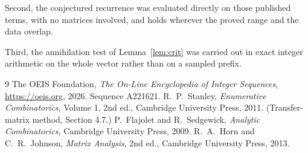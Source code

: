 \documentclass[11pt,a4paper]{article}
\theoremstyle{plain}
\theoremstyle{definition}
\begin{document}
Second, the conjectured recurrence was evaluated directly on those published terms, with no
matrices involved, and holds wherever the proved range and the data overlap.

Third, the annihilation test of Lemma~\ref{lem:crit} was carried out in exact integer
arithmetic on the whole vector rather than on a sampled prefix.

\begin{thebibliography}{9}
 The OEIS Foundation, \emph{The On-Line Encyclopedia of Integer
Sequences}, \url{https://oeis.org}, 2026. Sequence A221621.
 R.~P.~Stanley, \emph{Enumerative Combinatorics}, Volume 1, 2nd ed.,
Cambridge University Press, 2011. (Transfer-matrix method, Section 4.7.)
 P.~Flajolet and R.~Sedgewick, \emph{Analytic Combinatorics}, Cambridge
University Press, 2009.
 R.~A.~Horn and C.~R.~Johnson, \emph{Matrix Analysis}, 2nd ed., Cambridge
University Press, 2013.
\end{thebibliography}
\end{document}
